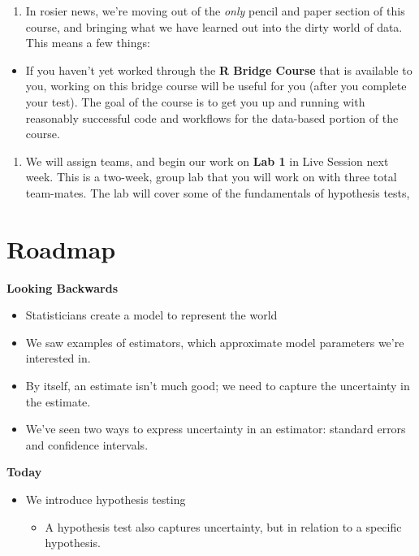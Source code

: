 \documentclass[
]{book}
\providecommand{\tightlist}{%
  \setlength{\itemsep}{0pt}\setlength{\parskip}{0pt}}
\theoremstyle{definition}
\theoremstyle{definition}
\theoremstyle{definition}
\theoremstyle{definition}
\theoremstyle{remark}
\begin{document}
\begin{enumerate}
\def\labelenumi{\arabic{enumi}.}
\setcounter{enumi}{1}
\tightlist
\item
  In rosier news, we're moving out of the \emph{only} pencil and paper section of this course, and bringing what we have learned out into the dirty world of data. This means a few things:
\end{enumerate}

\begin{itemize}
\tightlist
\item
  If you haven't yet worked through the \textbf{R Bridge Course} that is available to you, working on this bridge course will be useful for you (after you complete your test). The goal of the course is to get you up and running with reasonably successful code and workflows for the data-based portion of the course.
\end{itemize}

\begin{enumerate}
\def\labelenumi{\arabic{enumi}.}
\setcounter{enumi}{2}
\tightlist
\item
  We will assign teams, and begin our work on \textbf{Lab 1} in Live Session next week. This is a two-week, group lab that you will work on with three total team-mates. The lab will cover some of the fundamentals of hypothesis tests,
\end{enumerate}

\hypertarget{roadmap-3}{%
\section{Roadmap}\label{roadmap-3}}

\textbf{Looking Backwards}

\begin{itemize}
\tightlist
\item
  Statisticians create a model to represent the world
\item
  We saw examples of estimators, which approximate model parameters we're interested in.
\item
  By itself, an estimate isn't much good; we need to capture the uncertainty in the estimate.
\item
  We've seen two ways to express uncertainty in an estimator: standard errors and confidence intervals.
\end{itemize}

\textbf{Today}

\begin{itemize}
\tightlist
\item
  We introduce hypothesis testing

  \begin{itemize}
  \tightlist
  \item
    A hypothesis test also captures uncertainty, but in relation to a specific hypothesis.
  \end{itemize}
\end{itemize}
\end{document}
